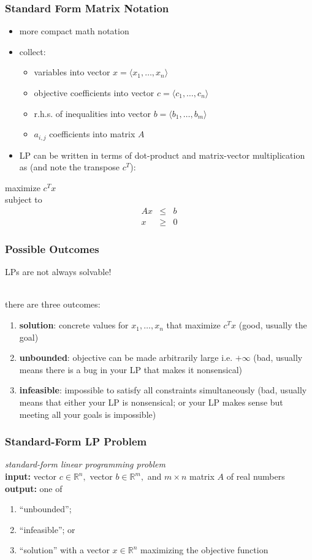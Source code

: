 \documentclass[10pt,aspectratio=169]{beamer}
\newcommand{\stanza}{ \\~\ }
\begin{document}
\begin{frame} \frametitle{Standard Form Matrix Notation}
\begin{itemize}
  \item more compact math notation
  \item collect:
  \begin{itemize}
    \item variables into vector $x=\langle x_1, \ldots, x_n \rangle$
    \item objective coefficients into vector $c=\langle c_1, \ldots, c_n\rangle$
    \item r.h.s. of inequalities into vector $b=\langle b_1, \ldots, b_m\rangle$
    \item $a_{i,j}$ coefficients into matrix $A$
  \end{itemize}
  \item LP can be written in terms of dot-product and matrix-vector multiplication
    as (and note the transpose $c^T$):
\end{itemize}
\vspace{.5cm}
maximize $c^T x$ \\
subject to
\begin{eqnarray*}
  Ax &\leq& b \\
  x &\geq& 0
\end{eqnarray*}
\end{frame}

\begin{frame} \frametitle{Possible Outcomes}
LPs are not always solvable! \stanza

there are three outcomes:
\begin{enumerate}
  \item \textbf{solution}: concrete values for $x_1, \ldots, x_n$ that maximize
    $c^T x$ (good, usually the goal)
  \item \textbf{unbounded}: objective can be made arbitrarily large i.e.
    $+\infty$ (bad, usually means there is a bug in your LP that makes it nonsensical)
  \item \textbf{infeasible}: impossible to satisfy all constraints simultaneously
  (bad, usually means that either your LP is nonsensical; or your LP makes sense
    but meeting all your goals is impossible)
\end{enumerate}
\end{frame}

\begin{frame} \frametitle{Standard-Form LP Problem}
\emph{standard-form linear programming problem} \\
\textbf{input:} vector $c \in \mathbb{R}^n,$ vector $b \in \mathbb{R}^m,$
  and $m \times n$ matrix $A$ of real numbers \\
\textbf{output:} one of
\begin{enumerate}
  \item ``unbounded'';
  \item ``infeasible''; or
  \item ``solution'' with a vector $x \in \mathbb{R}^n$
    maximizing the objective function
\end{enumerate}

\end{frame}
\end{document}
